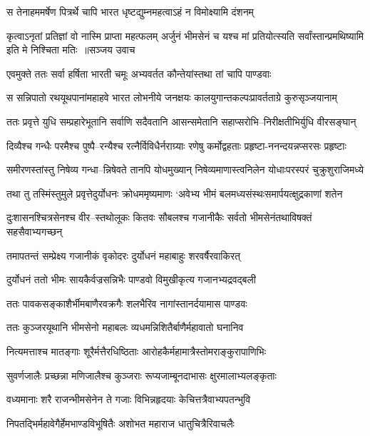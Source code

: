 \twolineshloka
{स तेनाहममर्षेण पित्रर्थे चापि भारत}
{धृष्टद्युम्नमहत्वाऽहं न विमोक्ष्यामि दंशनम्}


\fourlineindentedshloka
{कृत्वाऽनृतां प्रतिज्ञां वो नास्मि प्राप्ता महत्फलम्}
{अर्जुनं भीमसेनं च यश्च मां प्रतियोत्स्यति}
{सर्वांस्तान्प्रमथिष्यामि इति मे निश्चिता मतिः ॥सञ्जय उवाच}
{}


\twolineshloka
{एवमुक्ते ततः सर्वा हर्षिता भारती चमूः}
{अभ्यवर्तत कौन्तेयांस्तथा तां चापि पाण्डवाः}


\twolineshloka
{स सन्निपातो रथयूथपानांमहाहवे भारत लोभनीये}
{जनक्षयः कालयुगान्तकल्पःप्रावर्तताग्रे कुरुसृञ्जयानाम्}


\twolineshloka
{ततः प्रवृत्ते युधि सम्प्रहारेभूतानि सर्वाणि सदैवतानि}
{आसन्समेतानि सहाप्सरोभि--निरीक्षतीभिर्युधि वीरसङ्घान्}


\twolineshloka
{दिव्यैश्च गन्धैः परमैश्च पुष्पै--रन्यैश्च रत्नैर्विविधैर्नराग्र्याः}
{रणेषु कर्मोद्वहताः प्रहृष्टा-ननन्दयन्नप्सरसः प्रहृष्टाः}


\twolineshloka
{समीरणस्तांस्तु निषेव्य गन्धा--न्निषेवते तानपि योधमुख्यान्}
{निषेव्यमाणास्त्वनिलेन योधाःपरस्परं चुक्रुशुराजिमध्ये}


\twolineshloka
{तथा तु तस्मिंस्तुमुले प्रवृत्तेदुर्योधनः क्रोधममृष्यमाणः}
{`अवेभ्य भीमं बलमध्यसंस्थःसमार्पयत्क्षुद्रकाणां शतेन}


\twolineshloka
{दुःशासनश्चित्रसेनश्च वीर--स्तथोलूकः कितवः सौबलश्च}
{गजानीकैः सर्वतो भीमसेनंतथाविषक्तं सहसैवाभ्यगच्छन्}


\twolineshloka
{तमापतन्तं सम्प्रेक्ष्य गजानीकं वृकोदरः}
{दुर्योधनं महाबाहुः शरवर्षैरवाकिरत्}


\twolineshloka
{दुर्योधनं ततो भीमः सायकैर्वज्रसन्निभैः}
{पाण्डवो विमुखीकृत्य गजानभ्यद्रवद्बली}


\twolineshloka
{ततः पावकसङ्काशैर्भीमबाणैरवक्रगैः}
{शलभैरिव नागांस्तानर्दयामास पाण्डवः}


\twolineshloka
{ततः कुञ्जरयूथानि भीमसेनो महाबलः}
{व्यधमन्निशितैर्बाणैर्महावातो घनानिव}


\twolineshloka
{नित्यमत्ताश्च मातङ्गाः शूरैर्मत्तैरधिष्ठिताः}
{आरोहकैर्महामात्रैस्तोमराङ्कुरापाणिभिः}


\twolineshloka
{सुवर्णजालैः प्रच्छन्ना मणिजालैश्च कुञ्जराः}
{रूप्यजाम्बूनदाभासः क्षुरमालाभ्यलङ्कृताः}


\twolineshloka
{वध्यमानाः शरै राजन्भीमसेनेन ते गजाः}
{विभिन्नहृदयाः केचित्तत्रैवाभ्यपतन्भुवि}


\twolineshloka
{निपतद्भिर्महावेगैर्हेमभाण्डविभूषितैः}
{अशोभत महाराज धातुचित्रैरिवाचलैः}


